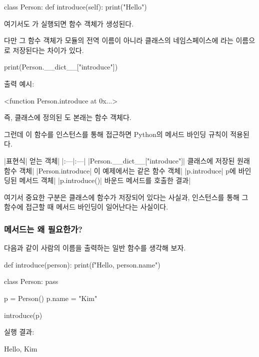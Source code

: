 \begin{dhkcode}
class Person:
    def introduce(self):
        print("Hello")
\end{dhkcode}

여기서도 가 실행되면 함수 객체가 생성된다.

다만 그 함수 객체가 모듈의 전역 이름이 아니라 클래스의 네임스페이스에 라는 이름으로 저장된다는 차이가 있다.

\begin{dhkcode}
print(Person.__dict__["introduce"])
\end{dhkcode}

출력 예시:

\begin{dhkzsh}
<function Person.introduce at 0x...>
\end{dhkzsh}

즉,  클래스에 정의된 도 본래는 함수 객체다.

그런데 이 함수를 인스턴스를 통해 접근하면 Python의 메서드 바인딩 규칙이 적용된다.

\begin{dhktable}
|표현식|	얻는 객체|
|:---|:---|
|Person.__dict__["introduce"]|	클래스에 저장된 원래 함수 객체|
|Person.introduce|	이 예제에서는 같은 함수 객체|
|p.introduce|	p에 바인딩된 메서드 객체|
|p.introduce()|	바운드 메서드를 호출한 결과|
\end{dhktable}

여기서 중요한 구분은 클래스에 함수가 저장되어 있다는 사실과, 인스턴스를 통해 그 함수에 접근할 때 메서드 바인딩이 일어난다는 사실이다.

\subsubsection{메서드는 왜 필요한가?}

다음과 같이 사람의 이름을 출력하는 일반 함수를 생각해 보자.

\begin{dhkcode}
def introduce(person):
    print(f"Hello, {person.name}")

class Person:
    pass

p = Person()
p.name = "Kim"

introduce(p)
\end{dhkcode}

실행 결과:

\begin{dhkzsh}
Hello, Kim
\end{dhkzsh}

